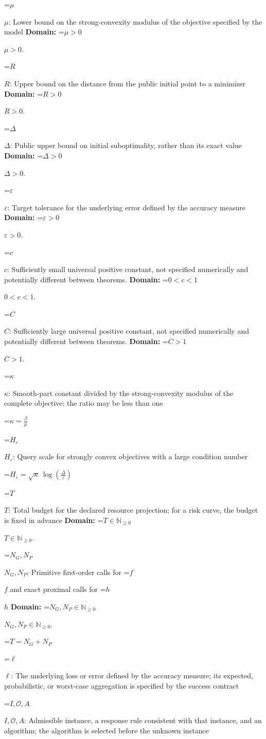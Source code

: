 \documentclass[10pt,a4paper]{article}
\newcommand{\AtlasMath}[1]{\par\begingroup\centering\setbox0=\hbox{$\displaystyle #1$}\ifdim\wd0>1.4\linewidth\typeout{ATLAS WIDE FORMULA: \the\wd0}\fi\ifdim\wd0>\linewidth\resizebox{\linewidth}{!}{\box0}\else\box0\fi\par\endgroup}
\newcommand{\AtlasInlineMath}[1]{\begingroup\setbox0=\hbox{$#1$}\ifdim\wd0>.4\linewidth\endgroup\AtlasMath{#1}\else\endgroup$#1$\fi}
\begin{document}
\AtlasInlineMath{\mu}: Lower bound on the strong-convexity modulus of the objective specified by the model \textbf{Domain:} \AtlasInlineMath{\mu>0}.

\AtlasInlineMath{R}: Upper bound on the distance from the public initial point to a minimizer \textbf{Domain:} \AtlasInlineMath{R>0}.

\AtlasInlineMath{\Delta}: Public upper bound on initial suboptimality, rather than its exact value \textbf{Domain:} \AtlasInlineMath{\Delta>0}.

\AtlasInlineMath{\varepsilon}: Target tolerance for the underlying error defined by the accuracy measure \textbf{Domain:} \AtlasInlineMath{\varepsilon>0}.

\AtlasInlineMath{c}: Sufficiently small universal positive constant, not specified numerically and potentially different between theorems. \textbf{Domain:} \AtlasInlineMath{0<c<1}.

\AtlasInlineMath{C}: Sufficiently large universal positive constant, not specified numerically and potentially different between theorems. \textbf{Domain:} \AtlasInlineMath{C>1}.

\AtlasInlineMath{\kappa}: Smooth-part constant divided by the strong-convexity modulus of the complete objective; the ratio may be less than one


\AtlasMath{\kappa=\frac{\beta}{\mu}}


\AtlasInlineMath{H_\varepsilon}: Query scale for strongly convex objectives with a large condition number


\AtlasMath{H_\varepsilon=\sqrt{\kappa}\,\log(\frac{\Delta}{\varepsilon})}


\AtlasInlineMath{T}: Total budget for the declared resource projection; for a risk curve, the budget is fixed in advance \textbf{Domain:} \AtlasInlineMath{T\in\mathbb{N}_{\ge0}}.

\AtlasInlineMath{N_G,N_P}: Primitive first-order calls for \AtlasInlineMath{f} and exact proximal calls for \AtlasInlineMath{h} \textbf{Domain:} \AtlasInlineMath{N_G,N_P\in\mathbb{N}_{\ge0}}.


\AtlasMath{T=N_G+N_P}


\AtlasInlineMath{\ell}: The underlying loss or error defined by the accuracy measure; its expected, probabilistic, or worst-case aggregation is specified by the success contract

\AtlasInlineMath{I,\mathcal{O},A}: Admissible instance, a response rule consistent with that instance, and an algorithm; the algorithm is selected before the unknown instance
\end{document}
